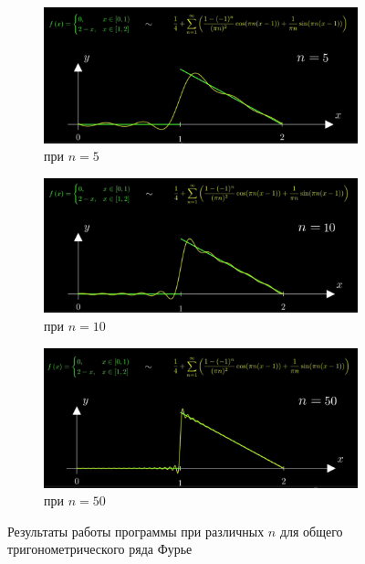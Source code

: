 \documentclass[a5paper, 10pt]{article}
\theoremstyle{definition}
\theoremstyle{plain}
\theoremstyle{remark}
\begin{document}
\begin{figure}[h!]
		\begin{center}
			\begin{subfigure}{0.7\linewidth}
				\includegraphics[width=\linewidth]{"./pictures/o_5.png"}
				\caption{при $n=5$}
			\end{subfigure}
			\begin{subfigure}{0.7\linewidth}
				\includegraphics[width=\linewidth]{"./pictures/o_10.png"}
				\caption{при $n=10$}
			\end{subfigure}
			\begin{subfigure}{0.7\linewidth}
				\includegraphics[width=\linewidth]{"./pictures/o_50.png"}
				\caption{при $n=50$}
			\end{subfigure}
		\caption{Результаты работы программы при различных $n$ для общего тригонометрического ряда Фурье}\label{result}
		\end{center}
	\end{figure}
\end{document}
